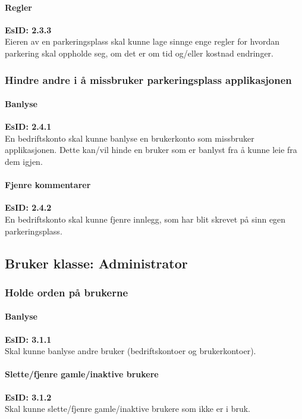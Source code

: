 \documentclass[12pt]{article}
\begin{document}
            \paragraph{Regler}
            \textbf{EsID: 2.3.3}\\Eieren av en parkeringsplass skal kunne lage sinnge enge regler for hvordan parkering skal oppholde seg, om det er om tid og/eller kostnad endringer.
        
        \subsubsection{Hindre andre i å missbruker parkeringsplass applikasjonen}

            \paragraph{Banlyse}
            \textbf{EsID: 2.4.1}\\En bedriftskonto skal kunne banlyse en brukerkonto som missbruker applikasjonen. Dette kan/vil hinde en bruker som er banlyst fra å kunne leie fra dem igjen.

            \paragraph{Fjenre kommentarer}
            \textbf{EsID: 2.4.2}\\En bedriftskonto skal kunne fjenre innlegg, som har blit skrevet på sinn egen parkeringsplass.

    \subsection{Bruker klasse: Administrator}

        \subsubsection{Holde orden på brukerne}

            \paragraph{Banlyse}
            \textbf{EsID: 3.1.1}\\Skal kunne banlyse andre bruker (bedriftskontoer og brukerkontoer).

            \paragraph{Slette/fjenre gamle/inaktive brukere}
            \textbf{EsID: 3.1.2}\\Skal kunne slette/fjenre gamle/inaktive brukere som ikke er i bruk.
\end{document}
